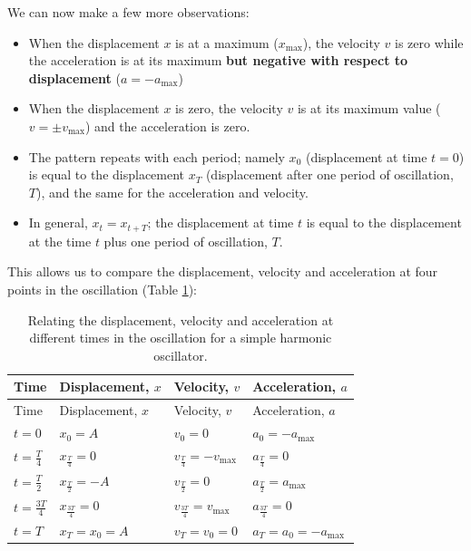 \documentclass[
]{book}
\providecommand{\tightlist}{%
  \setlength{\itemsep}{0pt}\setlength{\parskip}{0pt}}
\begin{document}
We can now make a few more observations:

\begin{itemize}
\tightlist
\item
  When the displacement \(x\) is at a maximum (\(x_\textrm{max}\)), the velocity \(v\) is zero while the acceleration is at its maximum \textbf{but negative with respect to displacement} (\(a= -a_\textrm{max}\))
\item
  When the displacement \(x\) is zero, the velocity \(v\) is at its maximum value (\(v = \pm v_\textrm{max}\)) and the acceleration is zero.
\item
  The pattern repeats with each period; namely \(x_0\) (displacement at time \(t = 0\)) is equal to the displacement \(x_T\) (displacement after one period of oscillation, \(T\)), and the same for the acceleration and velocity.
\item
  In general, \(x_t = x_{t+T}\); the displacement at time \(t\) is equal to the displacement at the time \(t\) plus one period of oscillation, \(T\).
\end{itemize}

This allows us to compare the displacement, velocity and acceleration at four points in the oscillation (Table \ref{tab:ch1-xva-comparison1}):

\begin{longtable}[]{@{}
  >{\raggedright\arraybackslash}p{}
  >{\raggedright\arraybackslash}p{}
  >{\raggedright\arraybackslash}p{}
  >{\raggedright\arraybackslash}p{}@{}}
\caption{\label{tab:ch1-xva-comparison1} Relating the displacement, velocity and acceleration at different times in the oscillation for a simple harmonic oscillator.}\tabularnewline
\toprule
Time & Displacement, \(x\) & Velocity, \(v\) & Acceleration, \(a\) \\
\midrule
\endfirsthead
\toprule
Time & Displacement, \(x\) & Velocity, \(v\) & Acceleration, \(a\) \\
\midrule
\endhead
\(t = 0\) & \(x_0 = A\) & \(v_0 = 0\) & \(a_0 = -a_{\textrm{max}}\) \\
\(t = \frac{T}{4}\) & \(x_{\frac{T}{4}} = 0\) & \(v_{\frac{T}{4}} = -v_\textrm{max}\) & \(a_{\frac{T}{4}} = 0\) \\
\(t = \frac{T}{2}\) & \(x_{\frac{T}{2}} = -A\) & \(v_{\frac{T}{2}} = 0\) & \(a_{\frac{T}{2}} = a_{\textrm{max}}\) \\
\(t = \frac{3T}{4}\) & \(x_{\frac{3T}{4}} = 0\) & \(v_{\frac{3T}{4}} = v_\textrm{max}\) & \(a_{\frac{3T}{4}} = 0\) \\
\(t = T\) & \(x_T = x_0 = A\) & \(v_T = v_0 = 0\) & \(a_T = a_0 = -a_{\textrm{max}}\) \\
\bottomrule
\end{longtable}
\end{document}
